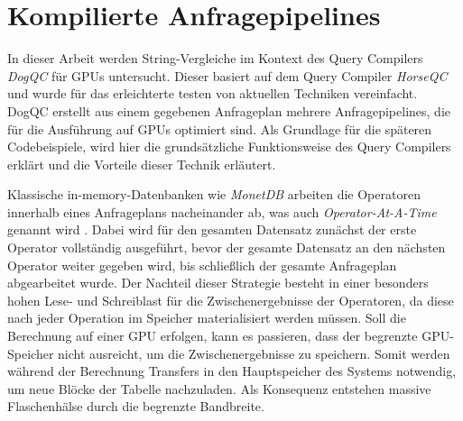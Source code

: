 \chapter{Kompilierte Anfragepipelines}
\label{sec:pipelining}

In dieser Arbeit werden String-Vergleiche im Kontext des Query Compilers \emph{DogQC} für GPUs untersucht.
Dieser basiert auf dem Query Compiler \emph{HorseQC} \cite{Funke2018} und wurde für das erleichterte testen von aktuellen Techniken vereinfacht.
DogQC erstellt aus einem gegebenen Anfrageplan mehrere Anfragepipelines, die für die Ausführung auf GPUs optimiert sind.
Als Grundlage für die späteren Codebeispiele, wird hier die grundsätzliche Funktionsweise des Query Compilers erklärt und die Vorteile dieser Technik erläutert.

Klassische in-memory-Datenbanken wie \emph{MonetDB} arbeiten die Operatoren innerhalb eines Anfrageplans nacheinander ab, was auch \emph{Operator-At-A-Time} genannt wird \cite{Varga2018}.
Dabei wird für den gesamten Datensatz zunächst der erste Operator vollständig ausgeführt, bevor der gesamte Datensatz an den nächsten Operator weiter gegeben wird, bis schließlich der gesamte Anfrageplan abgearbeitet wurde.
Der Nachteil dieser Strategie besteht in einer besonders hohen Lese- und Schreiblast für die Zwischenergebnisse der Operatoren, da diese nach jeder Operation im Speicher materialisiert werden müssen.
Soll die Berechnung auf einer GPU erfolgen, kann es passieren, dass der begrenzte GPU-Speicher nicht ausreicht, um die Zwischenergebnisse zu speichern.
Somit werden während der Berechnung Transfers in den Hauptspeicher des Systems notwendig, um neue Blöcke der Tabelle nachzuladen.
Als Konsequenz entstehen massive Flaschenhälse durch die begrenzte Bandbreite.

